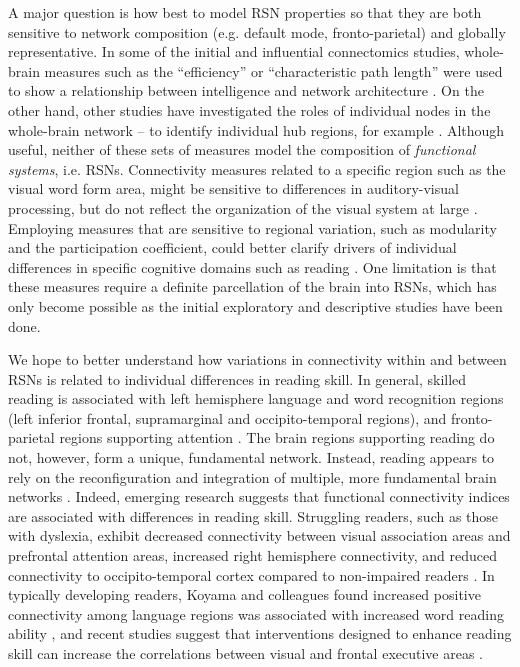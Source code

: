 A major question is how best to model RSN properties so that they are both sensitive to network composition (e.g. default mode, fronto-parietal) and globally representative. In some of the initial and influential connectomics studies, whole-brain measures such as the ``efficiency'' or ``characteristic path length'' were used to show a relationship between intelligence and network architecture \citep{Stam2014}. On the other hand, other studies have investigated the roles of individual nodes in the whole-brain network -- to identify individual hub regions, for example \citep{Betzel2013}. Although useful, neither of these sets of measures model the composition of \textit{functional systems}, i.e. RSNs. Connectivity measures related to a specific region such as the visual word form area, might be sensitive to differences in auditory-visual processing, but do not reflect the organization of the visual system at large \citep{Rubinov2010}. Employing measures that are sensitive to regional variation, such as modularity and the participation coefficient, could better clarify drivers of individual differences in specific cognitive domains such as reading \citep{Cao2016}. One limitation is that these measures require a definite parcellation of the brain into RSNs, which has only become possible as the initial exploratory and descriptive studies have been done.

We hope to better understand how variations in connectivity within and between RSNs is related to individual differences in reading skill. In general, skilled reading is associated with left hemisphere language and word recognition regions (left inferior frontal, supramarginal and occipito-temporal regions), and fronto-parietal regions supporting attention \citep{Paulesu2014}. The brain regions supporting reading do not, however, form a unique, fundamental network. Instead, reading appears to rely on the reconfiguration and integration of multiple, more fundamental brain networks \citep{Koyama2010, Vogel2013}. Indeed, emerging research suggests that functional connectivity indices are associated with differences in reading skill. Struggling readers, such as those with dyslexia, exhibit decreased connectivity between visual association areas and prefrontal attention areas, increased right hemisphere connectivity, and reduced connectivity to occipito-temporal cortex compared to non-impaired readers \citep{Finn2014}. In typically developing readers, Koyama and colleagues found increased positive connectivity among language regions was associated with increased word reading ability \citep{Koyama2011}, and recent studies suggest that interventions designed to enhance reading skill can increase the correlations between visual and frontal executive areas \citep{Horowitz-Kraus2015}. 

